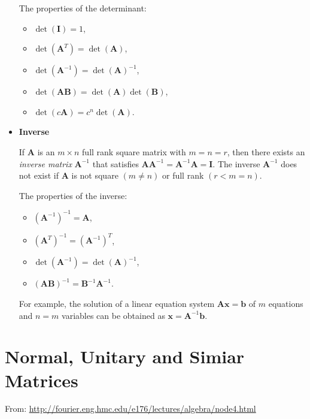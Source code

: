 \documentclass[10pt,b5paper,titlepage]{book}
\begin{document}
\begin{itemize}
        The properties of the determinant:

        \begin{itemize}
            \item $\det(\mathbf{I}) = 1$,
            \item $\det(\mathbf{A}^{T}) = \det(\mathbf{A})$,
            \item $\det(\mathbf{A}^{-1}) = \det(\mathbf{A})^{-1}$,
            \item $\det(\mathbf{A}\mathbf{B}) = \det(\mathbf{A})\det(\mathbf{B})$,
            \item $\det(c\mathbf{A}) = c^{n} \det(\mathbf{A})$.
        \end{itemize}

    \item \textbf{Inverse}

        If $\mathbf{A}$ is an $m \times n$ full rank square matrix with $m = n = r$,
        then there exists an  \textit{inverse matrix} $\mathbf{A}^{-1}$ that
        satisfies $\mathbf{A}\mathbf{A}^{-1} = \mathbf{A}^{-1}\mathbf{A} = \mathbf{I}$.
        The inverse $\mathbf{A}^{-1}$ does not exist if $\mathbf{A}$ is not
        square $(m \neq n)$ or full rank $(r < m = n)$.

        The properties of the inverse:

        \begin{itemize}
            \item $(\mathbf{A}^{-1})^{-1} = \mathbf{A}$,
            \item $(\mathbf{A}^{T})^{-1} = (\mathbf{A}^{-1})^{T}$,
            \item $\det(\mathbf{A}^{-1}) = \det(\mathbf{A})^{-1}$,
            \item $(\mathbf{A}\mathbf{B})^{-1} = \mathbf{B}^{-1}\mathbf{A}^{-1}$.
        \end{itemize}

        For example, the solution of a linear equation system
        $\mathbf{A}\mathbf{x} = \mathbf{b}$ of $m$ equations and $n = m$ variables
        can be obtained as $\mathbf{x} = \mathbf{A}^{-1}\mathbf{b}$.
\end{itemize}



\chapter{Normal, Unitary and Simiar Matrices}

From: \url{http://fourier.eng.hmc.edu/e176/lectures/algebra/node4.html}
\end{document}
